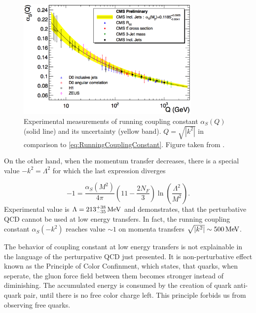 \begin{figure}[t]
  \centering
  \includegraphics[width=0.8\textwidth]{Chapter1/RunningCouplingConstant.png}
  \caption[Experimental measurements of running coupling constant $\alpha_S(Q)$
          (solid line) and its uncertainty (yellow band).
          $Q=\sqrt{\left|k^2\right|}$ in comparison to
          \eqref{eq:RunningCouplingConstant}.]
          {Experimental measurements of running
          coupling constant $\alpha_S(Q)$ (solid line) and its uncertainty (yellow
          band).  $Q=\sqrt{\left|k^2\right|}$ in comparison to
          \eqref{eq:RunningCouplingConstant}. Figure taken from
          \cite{RunningCouplingConstantMess}. }
  \label{fig:RunningCouplingConstant}
\end{figure}

On the other hand, when the momentum transfer decreases, there is a special value
$-k^2=\Lambda^2$ for which the last expression diverges

\begin{equation}
  -1 = \frac{\alpha_S(M^2)}{4\pi} \left( 11 - \frac{2N_F}{3} \right)
  \ln \left( \frac{\Lambda^2}{M^2} \right).
  \label{eq:RunningLambda}
\end{equation}
Experimental value is $\Lambda=213^{+38}_{-35}\,\text{MeV}$ \cite{wiki:QCDHistory} and
demonstrates, that the perturbative QCD cannot be used at low energy transfers.
In fact, the running coupling constant $\alpha_S(-k^2)$ reaches value $\sim 1$
on momenta transfers $\sqrt{\left| k^2 \right|} \sim 500\,\text{MeV}$. 

The behavior of coupling constant at low energy transfers is not explainable in
the language of the perturpative QCD just presented. It is non-perturbative effect
known as the Principle of Color Confinment, which states, that quarks, when
seperate, the gluon force field between them becomes stronger instead of
diminishing. The accumulated energy is consumed by the creation of quark
anti-quark pair, until there is no free color charge left. This principle
forbids us from observing free quarks.

